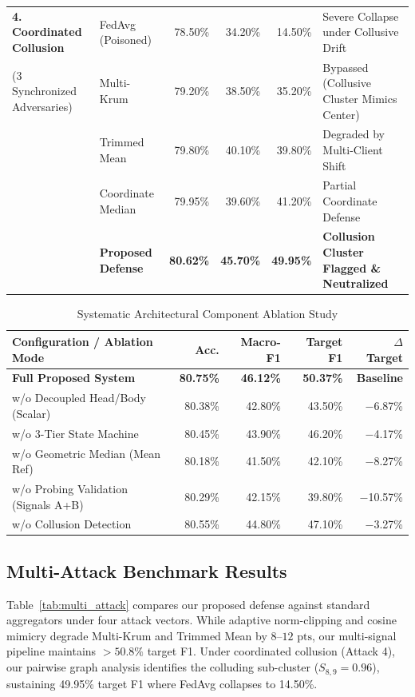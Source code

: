 \documentclass[conference]{IEEEtran}
\begin{document}
\begin{table}[t]
\begin{tabular}{@{}llrrrl@{}}
\midrule
\textbf{4. Coordinated Collusion} & FedAvg (Poisoned) & 78.50\% & 34.20\% & 14.50\% & Severe Collapse under Collusive Drift \\
(3 Synchronized Adversaries) & Multi-Krum & 79.20\% & 38.50\% & 35.20\% & Bypassed (Collusive Cluster Mimics Center) \\
& Trimmed Mean & 79.80\% & 40.10\% & 39.80\% & Degraded by Multi-Client Shift \\
& Coordinate Median & 79.95\% & 39.60\% & 41.20\% & Partial Coordinate Defense \\
& \textbf{Proposed Defense} & \textbf{80.62\%} & \textbf{45.70\%} & \textbf{49.95\%} & \textbf{Collusion Cluster Flagged \& Neutralized} \\
\bottomrule
\end{tabular}
\end{table}

\begin{table}[t]
\caption{Systematic Architectural Component Ablation Study}
\label{tab:ablation}
\centering
\begin{tabular}{@{}lrrrr@{}}
\toprule
\textbf{Configuration / Ablation Mode} & \textbf{Acc.} & \textbf{Macro-F1} & \textbf{Target F1} & \textbf{$\Delta$ Target} \\
\midrule
\textbf{Full Proposed System} & \textbf{80.75\%} & \textbf{46.12\%} & \textbf{50.37\%} & \textbf{Baseline} \\
w/o Decoupled Head/Body (Scalar) & 80.38\% & 42.80\% & 43.50\% & $-$6.87\% \\
w/o 3-Tier State Machine & 80.45\% & 43.90\% & 46.20\% & $-$4.17\% \\
w/o Geometric Median (Mean Ref) & 80.18\% & 41.50\% & 42.10\% & $-$8.27\% \\
w/o Probing Validation (Signals A+B) & 80.29\% & 42.15\% & 39.80\% & $-$10.57\% \\
w/o Collusion Detection & 80.55\% & 44.80\% & 47.10\% & $-$3.27\% \\
\bottomrule
\end{tabular}
\end{table}

\subsection{Multi-Attack Benchmark Results}
Table~\ref{tab:multi_attack} compares our proposed defense against standard aggregators under four attack vectors. While adaptive norm-clipping and cosine mimicry degrade Multi-Krum and Trimmed Mean by $8\text{--}12\text{ pts}$, our multi-signal pipeline maintains $> 50.8\%$ target F1. Under coordinated collusion (Attack 4), our pairwise graph analysis identifies the colluding sub-cluster ($S_{8,9} = 0.96$), sustaining 49.95\% target F1 where FedAvg collapses to 14.50\%.
\end{document}
